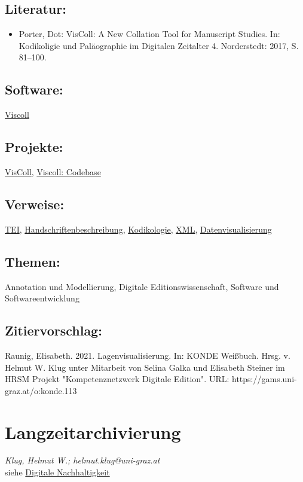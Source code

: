 \documentclass{article}
\begin{document}
        \subsection*{Literatur:}\begin{itemize}\item Porter, Dot: VisColl: A New Collation Tool for Manuscript Studies. In: Kodikoligie und Paläographie im Digitalen Zeitalter 4. Norderstedt: 2017, S. 81–100.\end{itemize}\subsection*{Software:}\href{https://github.com/leoba/VisColl}{Viscoll}\subsection*{Projekte:}\href{https://viscoll.org}{VisColl}, \href{https://github.com/KislakCenter/VisColl/}{Viscoll: Codebase}\subsection*{Verweise:}\href{https://gams.uni-graz.at/o:konde.178}{TEI}, \href{https://gams.uni-graz.at/o:konde.92}{Handschriftenbeschreibung}, \href{https://gams.uni-graz.at/o:konde.103}{Kodikologie}, \href{https://gams.uni-graz.at/o:konde.215}{XML}, \href{https://gams.uni-graz.at/o:konde.54}{Datenvisualisierung}\subsection*{Themen:}Annotation und Modellierung, Digitale Editionswissenschaft, Software und Softwareentwicklung\subsection*{Zitiervorschlag:}Raunig, Elisabeth. 2021. Lagenvisualisierung. In: KONDE Weißbuch. Hrsg. v. Helmut W. Klug unter Mitarbeit von Selina Galka und Elisabeth Steiner im HRSM Projekt "Kompetenznetzwerk Digitale Edition". URL: https://gams.uni-graz.at/o:konde.113\newpage\section*{Langzeitarchivierung} \emph{Klug, Helmut W.; helmut.klug@uni-graz.at}\\
        
    siehe \href{http://gams.uni-graz.at/o:konde.6}{Digitale Nachhaltigkeit}\\
            
\end{document}
